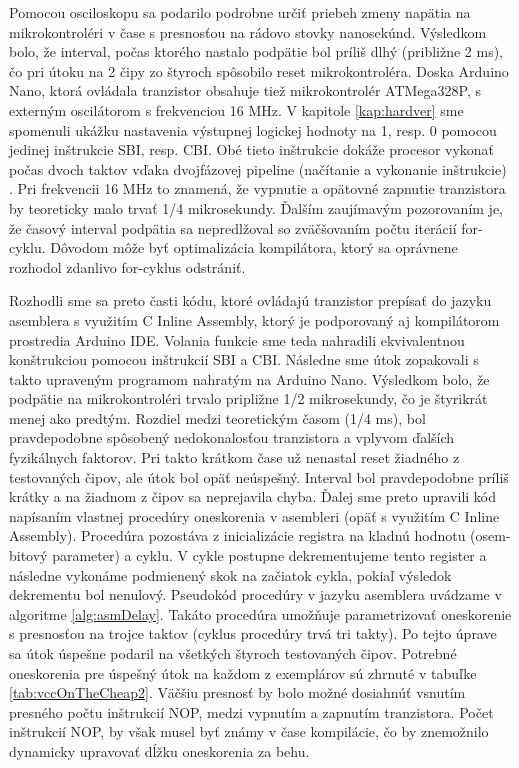 Pomocou osciloskopu sa podarilo podrobne určiť priebeh zmeny napätia na mikrokontroléri v čase s presnosťou na rádovo stovky nanosekúnd. Výsledkom bolo, že interval, počas ktorého nastalo podpätie bol príliš dlhý (približne 2 ms), čo pri útoku na 2 čipy zo štyroch spôsobilo reset mikrokontroléra. Doska Arduino Nano, ktorá ovládala tranzistor obsahuje tiež mikrokontrolér ATMega328P, s externým oscilátorom s frekvenciou 16 MHz. V kapitole \ref{kap:hardver} sme spomenuli ukážku nastavenia výstupnej logickej hodnoty na 1, resp. 0 pomocou jedinej inštrukcie SBI, resp. CBI. Obé tieto inštrukcie dokáže procesor vykonať počas dvoch taktov vďaka dvojfázovej pipeline (načítanie a vykonanie inštrukcie) \cite{atmegaData}. Pri frekvencii 16 MHz to znamená, že vypnutie a opätovné zapnutie tranzistora by teoreticky malo trvať 1/4 mikrosekundy. Ďalším zaujímavým pozorovaním je, že časový interval podpätia sa nepredlžoval so zväčšovaním počtu iterácií  for-cyklu. Dôvodom môže byť optimalizácia kompilátora, ktorý sa oprávnene rozhodol zdanlivo  for-cyklus odstrániť.

Rozhodli sme sa preto časti kódu, ktoré ovládajú tranzistor prepísať do jazyku asemblera s využitím C Inline Assembly, ktorý je podporovaný aj kompilátorom prostredia Arduino IDE. Volania funkcie  sme teda nahradili ekvivalentnou konštrukciou pomocou inštrukcií SBI a CBI. Následne sme útok zopakovali s takto upraveným programom nahratým na Arduino Nano. Výsledkom bolo, že podpätie na mikrokontroléri trvalo pripližne 1/2 mikrosekundy, čo je štyrikrát menej ako predtým. Rozdiel medzi teoretickým časom (1/4 ms), bol pravdepodobne spôsobený nedokonalosťou tranzistora a vplyvom ďalších fyzikálnych faktorov. Pri takto krátkom čase už nenastal reset žiadného z testovaných čipov, ale útok bol opäť neúspešný. Interval bol pravdepodobne príliš krátky a na žiadnom z čipov sa neprejavila chyba. Ďalej sme preto upravili kód napísaním vlastnej procedúry oneskorenia v asembleri (opäť s využitím C Inline Assembly). Procedúra pozostáva z inicializácie registra na kladnú hodnotu (osem-bitový parameter) a cyklu. V cykle postupne dekrementujeme tento register a následne vykonáme podmienený skok na začiatok cykla, pokiaľ výsledok dekrementu bol nenulový. Pseudokód procedúry v jazyku asemblera uvádzame v algoritme \ref{alg:asmDelay}. Takáto procedúra umožňuje parametrizovať oneskorenie s presnosťou na trojce taktov (cyklus procedúry trvá tri takty). Po tejto úprave sa útok úspešne podaril na všetkých štyroch testovaných čipov. Potrebné oneskorenia pre úspešný útok na každom z exemplárov sú zhrnuté v tabuľke \ref{tab:vccOnTheCheap2}. Väčšiu presnosť by bolo možné dosiahnúť vsnutím presného počtu inštrukcií NOP, medzi vypnutím a zapnutím tranzistora. Počet inštrukcií NOP, by však musel byť známy v čase kompilácie, čo by znemožnilo dynamicky upravovať dĺžku oneskorenia za behu.


